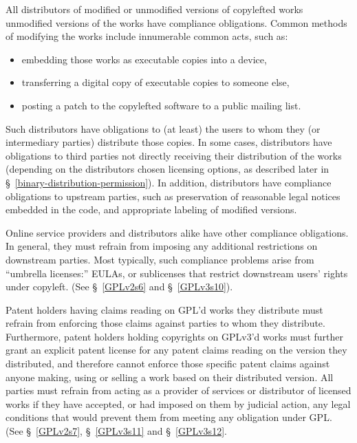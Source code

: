 All distributors of modified or unmodified versions of copylefted works
unmodified versions of the works have compliance obligations.  Common methods
of modifying the works include innumerable common acts, such as:

\begin{itemize}

  \item embedding those works as executable copies
    into a device,

  \item transferring a digital copy of executable copies to someone else,

  \item posting a patch to the copylefted software to a public mailing list.

\end{itemize}

Such distributors have obligations to (at least) the users to whom they (or
intermediary parties) distribute those copies.  In some cases, distributors
have obligations to third parties not directly receiving their distribution
of the works (depending on the distributors chosen licensing options, as
described later in \S~\ref{binary-distribution-permission}).  In addition,
distributors have compliance obligations to upstream parties, such as
preservation of reasonable legal notices embedded in the code, and
appropriate labeling of modified versions.

Online service providers and distributors alike have other compliance
obligations.  In general, they must refrain from imposing any additional
restrictions on downstream parties. Most typically, such compliance problems
arise from ``umbrella licenses:'' EULAs, or sublicenses that restrict
downstream users' rights under copyleft. (See \S~\ref{GPLv2s6} and
\S~\ref{GPLv3s10}).

Patent holders having claims reading on GPL'd works they distribute must
refrain from enforcing those claims against parties to whom they distribute.
Furthermore, patent holders holding copyrights on GPLv3'd works must further
grant an explicit patent license for any patent claims reading on the version
they distributed, and therefore cannot enforce those specific patent claims
against anyone making, using or selling a work based on their distributed
version.  All parties must refrain from acting as a provider of services or
distributor of licensed works if they have accepted, or had imposed on them
by judicial action, any legal conditions that would prevent them from meeting
any obligation under GPL\@.  (See \S~\ref{GPLv2s7}, \S~\ref{GPLv3s11} and
\S~\ref{GPLv3s12}.

